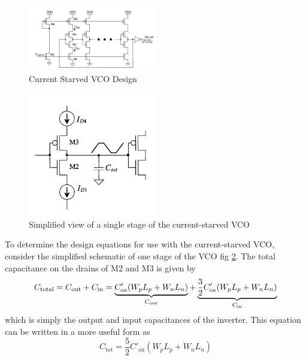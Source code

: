 \begin{figure}[H]
	\centering
	\includegraphics[width=0.5\textwidth]{figs/cs_vco_design.png}
	\caption{Current Starved VCO Design}
	\label{fig:cs_vco_design}
	\vspace{0.5cm}
\end{figure}
\begin{figure}[H]
	\centering
	\includegraphics[width=0.5\textwidth]{figs/vco_simplified.png}
	\caption{Simplified view of a single stage of the current-starved VCO}
	\label{fig:vco_simplified}
\end{figure}

To determine the design equations for use with the current-starved VCO, consider
the simplified schematic of one stage of the VCO fig \ref{fig:vco_simplified}. The total
capacitance on the drains of M2 and M3 is given by
\begin{equation}
	C_{\text{total}} = C_{\text{out}} + C_{\text{in}} = 
\underbrace{C'_{\text{ox}}(W_p L_p + W_n L_n)}_{\text{C\textsubscript{out}}} + 
\underbrace{\frac{3}{2} C'_{\text{ox}}(W_p L_p + W_n L_n)}_{\text{C\textsubscript{in}}}
\end{equation}
which is simply the output and input capacitances of the inverter. This equation can be written in a more useful form as
\begin{equation}
C_{\text{tot}} = \frac{5}{2} C'_{\text{ox}} (W_p L_p + W_n L_n)
\tag{19.19}
\end{equation}

